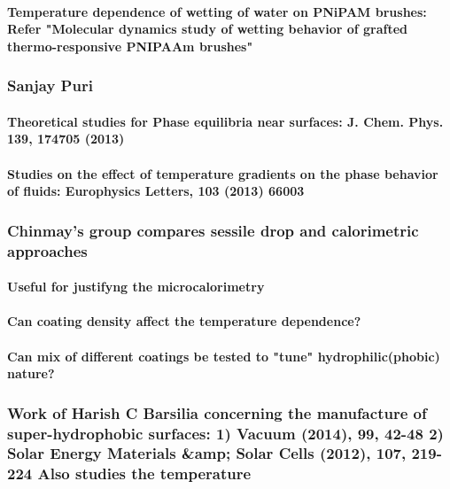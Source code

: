 \documentclass[a4paper,12pt,single,pdftex]{scrartcl}
\begin{document}
{\label{ID_21321814}\paragraph{Temperature dependence of wetting of water on PNiPAM brushes: Refer "Molecular dynamics study of wetting behavior of grafted thermo-responsive PNIPAAm brushes"}

\label{ID_154250283}\subsubsection{Sanjay Puri}

\label{ID_920584188}\paragraph{Theoretical studies for Phase equilibria near surfaces: J. Chem. Phys. 139, 174705 (2013)}

\label{ID_595749615}\paragraph{Studies on the effect of temperature gradients on the phase behavior of fluids: Europhysics Letters, 103 (2013) 66003}

\label{ID_135785427}\subsubsection{Chinmay's group compares sessile drop and calorimetric approaches}

\label{ID_1532965186}\paragraph{Useful for justifyng the microcalorimetry}

\label{ID_838488932}\paragraph{Can coating density affect the temperature dependence?}

\label{ID_1401479645}\paragraph{Can mix of different coatings be tested to "tune" hydrophilic(phobic) nature?}

\label{ID_1523203023}\subsubsection{Work of Harish C Barsilia concerning the manufacture of super-hydrophobic surfaces: 1) Vacuum (2014), 99, 42-48 2) Solar Energy Materials &amp; Solar Cells (2012), 107, 219-224 Also studies the temperature}

}
\end{document}
